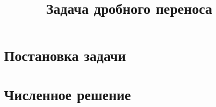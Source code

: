 \documentclass[12pt, russian, indentheadings]{report}
\begin{document}

\renewcommand{\labelitemi}{---}
\renewcommand{\labelitemii}{---}
\renewcommand{\labelitemiii}{---}
\renewcommand{\figurename}{Рисунок}
\renewcommand\thefigure{\Alph{part}.\arabic{chapter}.\arabic{figure}}
\renewcommand\thetable{\Alph{part}.\arabic{chapter}.\arabic{table}}
\frenchspacing

\title{Задача дробного переноса}


\chapter{Постановка задачи}


%

\chapter{Численное решение}


%	
\end{document}
